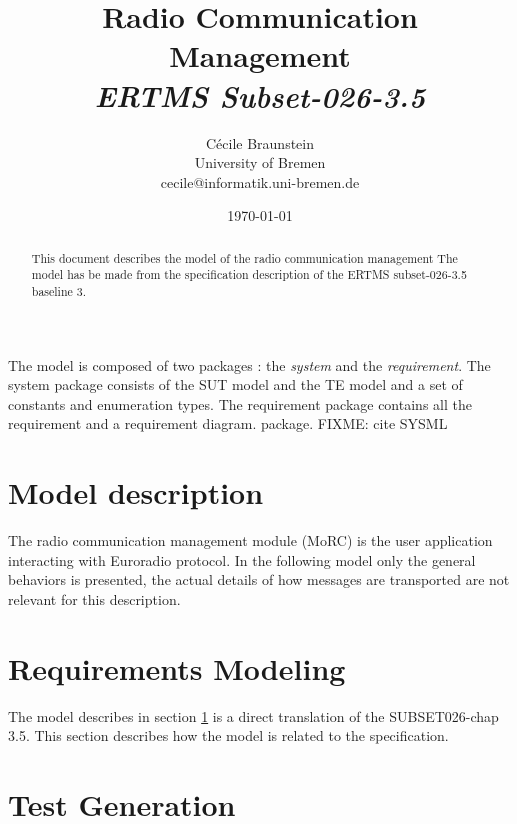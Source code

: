 \documentclass[11pt,notitlepage]{article}
\title{Radio Communication Management \\
    {\it ERTMS Subset-026-3.5}}
\author{C{\'e}cile Braunstein\\University of Bremen\\
cecile@informatik.uni-bremen.de}
\date{\today}                                           %
\newcommand{\FIXME}[1]{\marginpar{FIXME}\textsf{FIXME: #1}}
\begin{document}
\maketitle

\begin{abstract}
This document describes the model of the radio communication management The
model has be made from the specification description of the ERTMS subset-026-3.5
baseline 3.
\end{abstract}
The model is composed of two packages : the \emph{system} and the
\emph{requirement}. The system package consists of the SUT model and the TE
model and a set of constants and enumeration types. The
requirement package contains all the requirement and a requirement diagram.
package.
\FIXME{cite SYSML}
\section{Model description}
\label{sec:modeldescription}
The radio communication management module (MoRC) is the user application interacting
with Euroradio protocol. In the following model only the general behaviors is
presented, the actual details of how messages are transported are not relevant
for this description.

\section{Requirements Modeling}
\label{sec:requirements}
The model describes in section \ref{sec:modeldescription} is a direct
translation of the SUBSET026-chap 3.5. This section describes how the model is
related to the specification.

\section{Test Generation}
\label{sec:tests}

%


\end{document}
